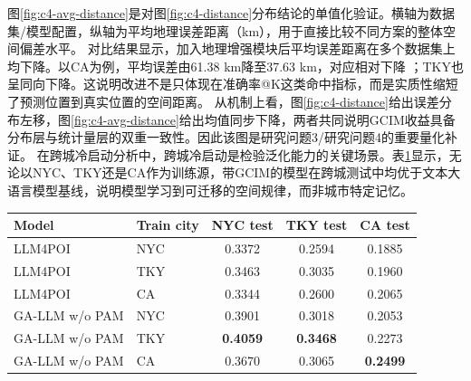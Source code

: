 图\ref{fig:c4-avg-distance}是对图\ref{fig:c4-distance}分布结论的单值化验证。横轴为数据集/模型配置，纵轴为平均地理误差距离（km），用于直接比较不同方案的整体空间偏差水平。
对比结果显示，加入地理增强模块后平均误差距离在多个数据集上均下降。以CA为例，平均误差由61.38 km降至37.63 km，对应相对下降 ；TKY也呈同向下降。这说明改进不是只体现在准确率@K这类命中指标，而是实质性缩短了预测位置到真实位置的空间距离。
从机制上看，图\ref{fig:c4-distance}给出误差分布左移，图\ref{fig:c4-avg-distance}给出均值同步下降，两者共同说明GCIM收益具备分布层与统计量层的双重一致性。因此该图是研究问题3/研究问题4的重要量化补证。
在跨城冷启动分析中，跨城冷启动是检验泛化能力的关键场景。表\ref{tab:c4-cross-city}显示，无论以NYC、TKY还是CA作为训练源，带GCIM的模型在跨城测试中均优于文本大语言模型基线，说明模型学习到可迁移的空间规律，而非城市特定记忆。

\begin{table}[htbp]
    \tblstyle
    \label{tab:c4-cross-city}
    \begin{tabular}{llccc}
        \toprule
        Model & Train city & NYC test & TKY test & CA test \\
        \midrule
        LLM4POI & NYC & 0.3372 & 0.2594 & 0.1885 \\
        LLM4POI & TKY & 0.3463 & 0.3035 & 0.1960 \\
        LLM4POI & CA  & 0.3344 & 0.2600 & 0.2065 \\
        \midrule
        GA-LLM w/o PAM & NYC & 0.3901 & 0.3018 & 0.2053 \\
        GA-LLM w/o PAM & TKY & \textbf{0.4059} & \textbf{0.3468} & 0.2273 \\
        GA-LLM w/o PAM & CA  & 0.3670 & 0.3065 & \textbf{0.2499} \\
        \bottomrule
    \end{tabular}
\end{table}


